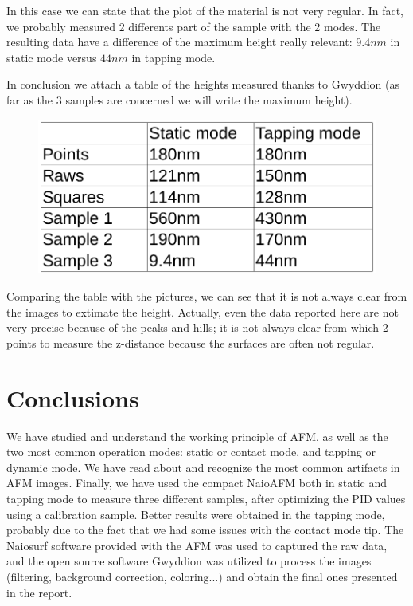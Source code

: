 \documentclass[11pt,a4paper]{article}
\begin{document}
In this case we can state that the plot of the material is not very regular. In fact, we probably measured 2 differents part of the sample with the 2 modes. The resulting data have a difference of the maximum height really relevant: $9.4nm$ in static mode versus $44nm$ in tapping mode.

In conclusion we attach a table of the heights measured thanks to Gwyddion (as far as the 3 samples are concerned we will write the maximum height).

\begin{figure}[ht]
\begin{center}
\includegraphics[scale=0.4]{table.png}
\end{center}
\end{figure}

Comparing the table with the pictures, we can see that it is not always clear from the images to extimate the height. Actually, even the data reported here are not very precise because of the peaks and hills; it is not always clear from which 2 points to measure the z-distance because the surfaces are often not regular.
\section{Conclusions}
We have studied and understand the working principle of AFM, as well as the two most common operation modes: static or contact mode, and tapping or dynamic mode. We have read about and recognize the most common artifacts in AFM images. Finally, we have used the compact NaioAFM both in static and tapping mode to measure three different samples, after optimizing the PID values using a calibration sample. Better results were obtained in the tapping mode, probably due to the fact that we had some issues with the contact mode tip. The Naiosurf software provided with the AFM was used to captured the raw data, and the open source software Gwyddion was utilized to process the images (filtering, background correction, coloring...) and obtain the final ones presented in the report.

\nocite{*}
\vfill


\end{document}

